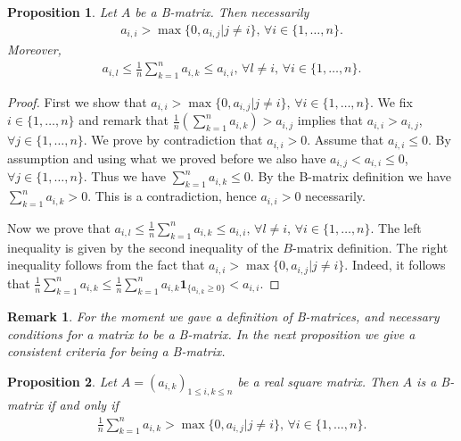 \documentclass[final,3p,authoryear,12pt]{elsarticle}
\newtheorem{remark}{Remark}
\newtheorem{proposition}{Proposition}
\begin{document}
\begin{proposition}
\label{proposition:Bmatrixnecessarycond}
    Let $A$ be a B-matrix. Then necessarily 
    \begin{eqnarray}
        a_{i,i} > \max\{0,a_{i,j}|j\neq i\} \text{, } \forall i \in \{1,\dots,n\}.
    \end{eqnarray}
    Moreover, 
    \begin{eqnarray}
        a_{i,l} \le \frac{1}{n}\sum_{k=1}^{n}a_{i,k} \le a_{i,i} \text{, } \forall l\neq i\text{, }\forall i \in \{1,\dots,n\}.
    \end{eqnarray}
\end{proposition}
\begin{proof}{}
    First we show that $a_{i,i} > \max\{0,a_{i,j}|j\neq i\} \text{, } \forall i \in \{1,\dots,n\}$. We fix $i\in\{1,\dots,n\}$ and remark that $\frac{1}{n}\left(\sum_{k=1}^{n}a_{i,k}\right)>a_{i,j}$ implies that $a_{i,i}>a_{i,j}$, $\forall j \in \{1,\dots,n\}$. We prove by contradiction that $a_{i,i}>0$. Assume that $a_{i,i}\le0$. By assumption and using what we proved before we also have $a_{i,j}<a_{i,i}\le 0$, $\forall j \in \{1,\dots,n\}$. Thus we have $\sum_{k=1}^{n}a_{i,k}\le0$. By the B-matrix definition we have $\sum_{k=1}^{n}a_{i,k}>0$. This is a contradiction, hence $a_{i,i}>0$ necessarily. 

    Now we prove that $a_{i,l} \le \frac{1}{n}\sum_{k=1}^{n}a_{i,k} \le a_{i,i} \text{, } \forall l\neq i\text{, }\forall i \in \{1,\dots,n\}$. The left inequality is given by the second inequality of the $B$-matrix definition. The right inequality follows from the fact that $a_{i,i} > \max\{0,a_{i,j}|j\neq i\}$. Indeed, it follows that $\frac{1}{n}\sum_{k=1}^{n}a_{i,k}\le\frac{1}{n}\sum_{k=1}^{n}a_{i,k}\pmb{1}_{\{a_{i,k}\ge0\}}<a_{i,i}.$
    
\end{proof}

\begin{remark}
    For the moment we gave a definition of B-matrices, and necessary conditions for a matrix to be a B-matrix. In the next proposition we give a consistent criteria for being a B-matrix. 
\end{remark}

\begin{proposition}
\label{proposition:Bmatrixequivalence}
    Let $A=(a_{i,k})_{1\le i,k\le n}$ be a real square matrix. Then $A$ is a B-matrix if and only if 
    \begin{eqnarray}
        \frac{1}{n}\sum_{k=1}^{n}a_{i,k} > \max\{0,a_{i,j}|j\neq i\} \text{, } \forall i \in \{1,\dots,n\}.
    \end{eqnarray}
\end{proposition}
\end{document}
